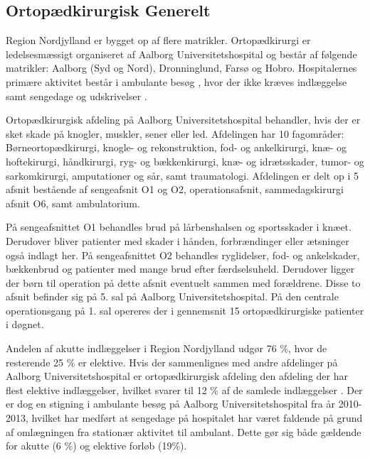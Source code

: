 \subsection{Ortopædkirurgisk Generelt}
Region Nordjylland er bygget op af flere matrikler. Ortopædkirurgi er ledelsesmæssigt organiseret af Aalborg Universitetshospital og består af følgende matrikler: Aalborg (Syd og Nord), Dronninglund, Farsø og Hobro. Hospitalernes primære aktivitet består i ambulante besøg , hvor der ikke kræves indlæggelse samt sengedage  og udskrivelser  \cite{ROLFS KILDE}. 

Ortopædkirurgisk afdeling på Aalborg Universitetshospital behandler, hvis der er sket skade på knogler, muskler, sener eller led. Afdelingen har 10 fagområder: Børneortopædkirurgi, knogle- og rekonstruktion, fod- og ankelkirurgi, knæ- og hoftekirurgi, håndkirurgi, ryg- og bækkenkirurgi, knæ- og idrætsskader, tumor- og sarkomkirurgi, amputationer og sår, samt traumatologi.
Afdelingen er delt op i 5 afsnit bestående af sengeafsnit O1 og O2, operationsafsnit, sammedagskirurgi afsnit O6, samt ambulatorium. 

På sengeafsnittet O1 behandles brud på lårbenshalsen og sportsskader i knæet. Derudover bliver patienter med skader i hånden, forbrændinger eller ætsninger også indlagt her.
På sengeafsnittet O2 behandles ryglidelser, fod- og ankelskader, bækkenbrud og patienter med mange brud efter færdselsuheld. Derudover ligger der børn til operation på dette afsnit eventuelt sammen med forældrene. Disse to afsnit befinder sig på 5. sal på Aalborg Universitetshospital.
På den centrale operationsgang på 1. sal opereres der i gennemsnit 15 ortopædkirurgiske patienter i døgnet. 




Andelen af akutte indlæggelser i Region Nordjylland udgør 76 \%, hvor de resterende 25 \% er elektive. Hvis der sammenlignes med andre afdelinger på Aalborg Universitetshospital er ortopædkirurgisk afdeling den afdeling der har flest elektive indlæggelser, hvilket svarer til 12 \% af de samlede indlæggelser . Der er dog en stigning i ambulante besøg på Aalborg Universitetshospital fra år 2010-2013, hvilket har medført at sengedage på hospitalet har været faldende på grund af omlægningen fra stationær aktivitet til ambulant. Dette gør sig både gældende for akutte (6 \%) og elektive forløb (19\%). 